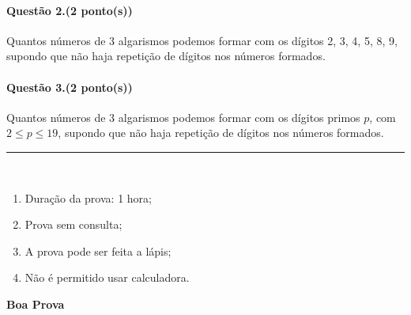 \documentclass[11pt, a4paper]{article}
\begin{document}
\paragraph{Questão 2.(2 ponto(s))} Quantos números de 3 algarismos
podemos formar com os dígitos 2, 3, 4, 5, 8, 9, supondo que não haja
repetição de dígitos nos números formados.

\paragraph{Questão 3.(2 ponto(s))} Quantos números de 3 algarismos
podemos formar com os dígitos primos $p$, com $2\leq p \leq 19$, supondo
que não haja repetição de dígitos nos números formados.


\vfill

\hrule\bigskip
{\footnotesize
{}\\
\begin{enumerate}
\item Duração da prova: 1 hora;
\item Prova sem consulta;
\item A prova pode ser feita a lápis;
\item Não é permitido usar calculadora.

\end{enumerate}
}

\begin{flushright}
\bf\large  Boa Prova
\end{flushright}
\end{document}
